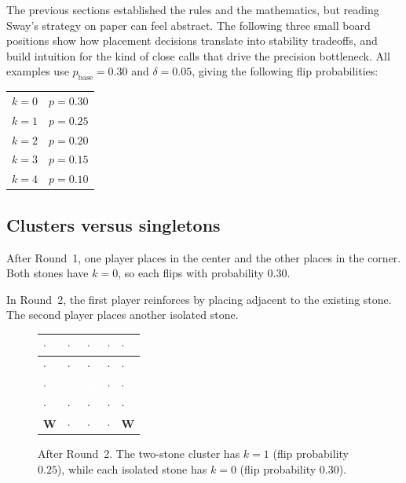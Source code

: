 The previous sections established the rules and the mathematics, but reading Sway's strategy on paper can feel abstract.
The following three small board positions show how placement decisions translate into stability tradeoffs, and build intuition for the kind of close calls that drive the precision bottleneck.
All examples use $p_{\text{base}} = 0.30$ and $\delta = 0.05$, giving the following flip probabilities:

\begin{center}
\begin{tabular}{cl}
$k = 0$ & $p = 0.30$ \\
$k = 1$ & $p = 0.25$ \\
$k = 2$ & $p = 0.20$ \\
$k = 3$ & $p = 0.15$ \\
$k = 4$ & $p = 0.10$
\end{tabular}
\end{center}

\subsection{Clusters versus singletons}

After Round~1, one player places in the center and the other places in the corner.
Both stones have $k = 0$, so each flips with probability $0.30$.

In Round~2, the first player reinforces by placing adjacent to the existing stone.
The second player places another isolated stone.

\begin{figure}[ht]
\centering
\begin{tabular}{|w{c}{1.2em}|w{c}{1.2em}|w{c}{1.2em}|w{c}{1.2em}|w{c}{1.2em}|}
\hline
$\cdot$ & $\cdot$ & $\cdot$ & $\cdot$ & $\cdot$ \\
\hline
$\cdot$ & $\cdot$ & $\cdot$ & $\cdot$ & $\cdot$ \\
\hline
$\cdot$ & \textcolor{white}{\textbf{B}} & \textcolor{white}{\textbf{B}} & $\cdot$ & $\cdot$ \\
\hline
$\cdot$ & $\cdot$ & $\cdot$ & $\cdot$ & $\cdot$ \\
\hline
\textbf{W} & $\cdot$ & $\cdot$ & $\cdot$ & \textbf{W} \\
\hline
\end{tabular}
\caption{After Round~2. The two-stone cluster has $k = 1$ (flip probability $0.25$), while each isolated stone has $k = 0$ (flip probability $0.30$).}
\label{fig:thick-vs-isolated}
\end{figure}

